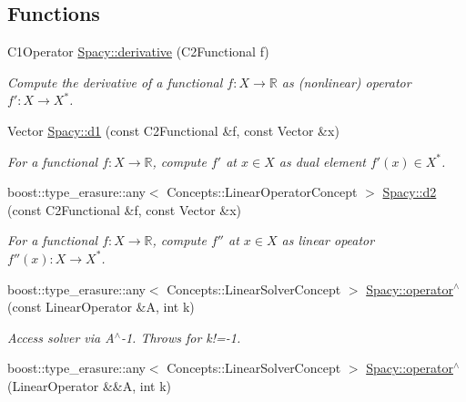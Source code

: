 \subsection*{Functions}
\begin{DoxyCompactItemize}
\item 
C1\+Operator \hyperlink{group__SpacyGroup_ga002fe344fa6d04a6ac59a74ea25fddb6_ga002fe344fa6d04a6ac59a74ea25fddb6}{Spacy\+::derivative} (C2\+Functional f)
\begin{DoxyCompactList}\small\item\em Compute the derivative of a functional $ f: X\to \mathbb{R} $ as (nonlinear) operator $ f':X\to X^* $. \end{DoxyCompactList}\item 
Vector \hyperlink{group__SpacyGroup_gab6646eb7068eb9f1369e639cf0b620a2_gab6646eb7068eb9f1369e639cf0b620a2}{Spacy\+::d1} (const C2\+Functional \&f, const Vector \&x)
\begin{DoxyCompactList}\small\item\em For a functional $ f: X\to \mathbb{R} $, compute $f'$ at $x\in X$ as dual element $ f'(x) \in X^* $. \end{DoxyCompactList}\item 
boost\+::type\+\_\+erasure\+::any$<$ Concepts\+::\+Linear\+Operator\+Concept $>$ \hyperlink{group__SpacyGroup_ga22f56f6ffd46496e786b435cabca71e0_ga22f56f6ffd46496e786b435cabca71e0}{Spacy\+::d2} (const C2\+Functional \&f, const Vector \&x)
\begin{DoxyCompactList}\small\item\em For a functional $ f: X\to \mathbb{R} $, compute $f''$ at $x\in X$ as linear opeator $ f''(x): X \to X^* $. \end{DoxyCompactList}\item 
\hypertarget{group__SpacyGroup_ga59dbadcd7afe1450933406e614381038}{}boost\+::type\+\_\+erasure\+::any$<$ Concepts\+::\+Linear\+Solver\+Concept $>$ \hyperlink{group__SpacyGroup_ga59dbadcd7afe1450933406e614381038}{Spacy\+::operator$^\wedge$} (const Linear\+Operator \&A, int k)\label{group__SpacyGroup_ga59dbadcd7afe1450933406e614381038}

\begin{DoxyCompactList}\small\item\em Access solver via A$^\wedge$-\/1. Throws for k!=-\/1. \end{DoxyCompactList}\item 
\hypertarget{group__SpacyGroup_gab598ac107e22bc6d409a77d3335ac85d}{}boost\+::type\+\_\+erasure\+::any$<$ Concepts\+::\+Linear\+Solver\+Concept $>$ \hyperlink{group__SpacyGroup_gab598ac107e22bc6d409a77d3335ac85d}{Spacy\+::operator$^\wedge$} (Linear\+Operator \&\&A, int k)\label{group__SpacyGroup_gab598ac107e22bc6d409a77d3335ac85d}


\end{DoxyCompactItemize}
